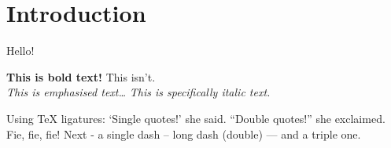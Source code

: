 \section{Introduction}

Hello!

\textbf{This is bold text!} This isn't. \\
\emph{This is emphasised text\ldots} \textit{This is specifically italic text.}

Using TeX ligatures: `Single quotes!' she said. ``Double quotes!'' she
exclaimed. Fie, fie, fie! Next - a single dash -- long dash (double) --- and a
triple one.
